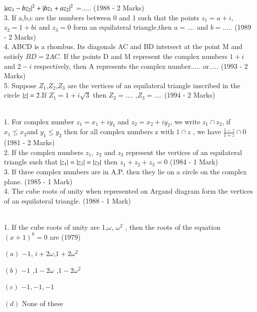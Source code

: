 \documentclass[journal,12pt,twocolumn]{IEEEtran}
\theoremstyle{remark}
\begin{document}
$\left\vert az_1-bz_2\right\vert^2+\left\vert bz_1+az_2\right\vert^2$ =.....  \hfill(1988 - 2 Marks)\\
3.  If a,b,c are the numbers between 0 and 1 such that the points $z_1=a+i$, $z_2=1+bi$ and $z_3=0$ form an equilateral triangle,then $a=....$ and $b=.....$ \hfill(1989 - 2 Marks)\\
4.  ABCD is a rhombus. Its diagonals AC and BD intersect at the point M and satisfy $BD=2AC$. If the points D and M represent the complex numbers $1+i$ and $2-i$ respectively, then A represents the complex number..... or..... \hfill(1993 - 2 Marks)\\
5.  Suppose $Z_1$,$Z_2$,$Z_3$ are the vertices of an equilateral triangle inscribed in the circle $\left\vert z\right\vert=2$.If $Z_1=1+i\sqrt{3}$ then $Z_2=....$ ,$Z_3=.... $ \hfill(1994 - 2 Marks)\\
\\
1.  For complex number $z_1=x_1+iy_1 $ and $z_2=x_2+iy_2$, we write $z_1\cap z_2$, if $x_1\leq x_2 $and $y_1\leq y_2 $ then for all complex numbers z with $1\cap z$ , we have $\frac{1-z}{1+z} \cap 0$  \hfill(1981 - 2 Marks)\\
2.  If the complex numbers $z_1$, $z_2$ and $z_3 $ represent the vertices of an equilateral triangle such that $ \left\vert z_1\right\vert = \left\vert z_2\right\vert=\left\vert z_3\right\vert $ then $z_1+z_2+z_3 = 0$ \hfill(1984 - 1 Mark)\\
3.  If three complex numbers are in A.P. then they lie on a circle on the complex plane. \hfill(1985 - 1 Mark)\\
4.  The cube roots of unity when represented on Argand diagram form the vertices of an equilateral triangle. \hfill(1988 - 1 Mark)\\
\\
  1. If the cube roots of unity are 1,$\omega $, $\omega^2$ , then the roots of the equation $(x+1)^8 = 0$ are                     \hfill(1979)
\begin{multicols}{2}
\item $(a)$ $-1$, $i+2\omega$,$1+2\omega^2$
\item $(b)$ $-1$ ,$1-2\omega$ ,$1-2\omega^2$
\item $(c)$ $ -1 , -1 ,-1 $ 
\item $(d)$ None of these
\end{multicols}
\end{document}
